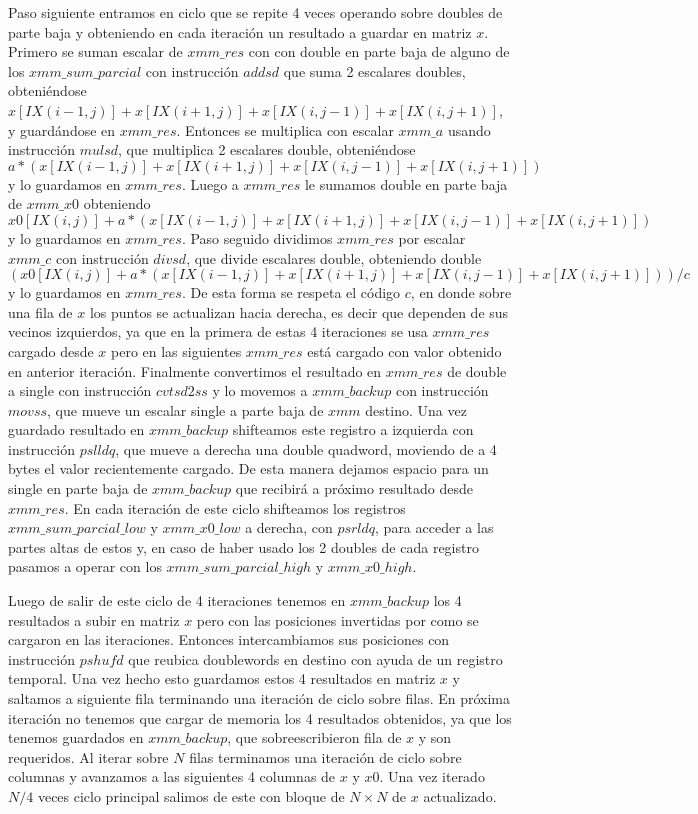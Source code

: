    Paso siguiente entramos en ciclo que se repite
 4 veces operando sobre doubles de parte baja y obteniendo en cada iteración un resultado a guardar 
 en matriz $x$. Primero se suman escalar de $xmm\_res$ con con double en parte baja de 
 alguno de los $xmm\_sum\_parcial$ con instrucción $addsd$ que suma 2 escalares doubles, obteniéndose 
  $x[IX(i-1,j)]+x[IX(i+1,j)]+x[IX(i,j-1)]+x[IX(i,j+1)]$, y guardándose en $xmm\_res$. Entonces se
 multiplica con escalar $xmm\_a$ usando instrucción $mulsd$, que multiplica 2 escalares double,
 obteniéndose $a*(x[IX(i-1,j)]+x[IX(i+1,j)]+x[IX(i,j-1)]+x[IX(i,j+1)]) $ y lo guardamos en $xmm\_res$.
Luego a $xmm\_res$ le sumamos double en parte baja de $xmm\_x0$ obteniendo 
 $x0[IX(i,j)] + a*(x[IX(i-1,j)]+x[IX(i+1,j)]+x[IX(i,j-1)]+x[IX(i,j+1)])$ y lo guardamos en $xmm\_res$.
 Paso seguido dividimos $xmm\_res$ por escalar $xmm\_c$ con instrucción $divsd$, que divide escalares
 double, obteniendo double $(x0[IX(i,j)] + a*(x[IX(i-1,j)]+x[IX(i+1,j)]+x[IX(i,j-1)]+x[IX(i,j+1)]))/c$
 y lo guardamos en $xmm\_res$. De esta forma se respeta el código $c$, en donde sobre una fila de $x$ los 
 puntos se actualizan hacia derecha, es decir que dependen de sus vecinos izquierdos, ya que en la 
 primera de estas 4 iteraciones se usa $xmm\_res$ cargado desde $x$ pero en las siguientes $xmm\_res$ está
 cargado con valor obtenido en anterior iteración. Finalmente convertimos el resultado en $xmm\_res$ 
 de double a single con instrucción $cvtsd2ss$ y lo movemos a $xmm\_backup$ con instrucción $movss$, que
 mueve un escalar single a parte baja de $xmm$ destino. 
Una vez guardado resultado en $xmm\_backup$ shifteamos este registro a izquierda con instrucción
 $pslldq$, que mueve a derecha una double quadword, moviendo de a 4 bytes el valor recientemente
 cargado. De esta manera dejamos espacio para un single en parte baja de $xmm\_backup$ que recibirá a 
 próximo resultado desde $xmm\_res$. En cada iteración de este ciclo shifteamos los registros 
 $xmm\_sum\_parcial\_low$ y $xmm\_x0\_low$ a derecha, con $psrldq$, para acceder a las partes altas de estos y, en caso de haber usado los 2 doubles de cada registro pasamos a operar con los $xmm\_sum\_parcial\_high$ y 
 $xmm\_x0\_high$.

Luego de salir de este ciclo de 4 iteraciones tenemos en $xmm\_backup$ los 4 resultados a subir en 
 matriz $x$ pero con las posiciones invertidas por como se cargaron en las iteraciones. Entonces
 intercambiamos sus posiciones con instrucción $pshufd$ que reubica doublewords en destino con 
 ayuda de un registro temporal. Una vez hecho esto guardamos estos 4 resultados en matriz $x$ y 
 saltamos a siguiente fila terminando una iteración de ciclo sobre filas. En próxima iteración
 no tenemos que cargar de memoria los 4 resultados obtenidos, ya que los tenemos guardados en
 $xmm\_backup$, que sobreescribieron fila de $x$ y son requeridos.
 Al iterar sobre $N$ filas terminamos una iteración de ciclo sobre columnas y avanzamos a las 
 siguientes 4 columnas de $x$ y $x0$. Una vez iterado $N/4$ veces ciclo principal salimos de este con bloque de 
 $N\times N$ de $x$ actualizado.

